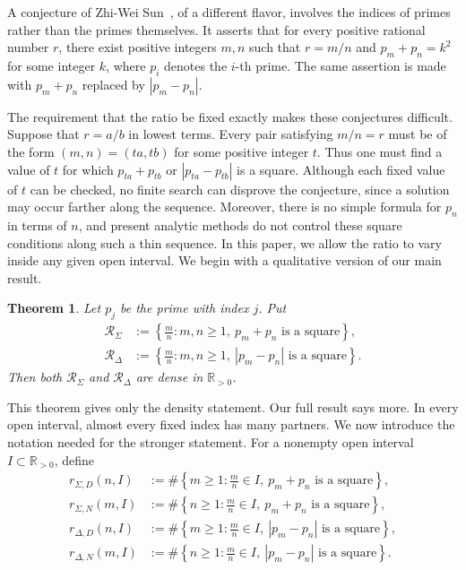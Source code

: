 \documentclass[12pt,reqno]{amsart}
\numberwithin{equation}{section}
\theoremstyle{plain}
\newtheorem{theorem}{Theorem}[section]
\theoremstyle{remark}
\begin{document}
A conjecture of Zhi-Wei Sun~\cite[Conjecture 4.4]{Sun2017}, of a different flavor, involves the indices of primes rather than the primes themselves.
It asserts that for every positive rational number $r$, there exist positive integers $m,n$ such that $r=m/n$ and $p_m+p_n=k^2$ for some integer $k$, where $p_i$ denotes the $i$-th prime.
The same assertion is made with $p_m+p_n$ replaced by $|p_m-p_n|$.

The requirement that the ratio be fixed exactly makes these conjectures difficult.
Suppose that $r=a/b$ in lowest terms.
Every pair satisfying $m/n=r$ must be of the form $(m,n)=(ta,tb)$ for some positive integer $t$.
Thus one must find a value of $t$ for which $p_{ta}+p_{tb}$ or $|p_{ta}-p_{tb}|$ is a square.  Although each fixed value of $t$ can be checked, no finite search can disprove the conjecture, since a
solution may occur farther along the sequence.  Moreover, there is no simple formula for $p_n$ in terms of $n$, and present analytic methods do not control
these square conditions along such a thin sequence.
In this paper, we allow the ratio to vary inside any given open interval.
We begin with a qualitative version of our main result.

\begin{theorem}\label{thm:density}
Let $p_j$ be the prime with index $j$.
Put
\begin{align*}
 \mathcal R_\Sigma
 &:=\left\{\frac mn:m,n\geq1,\ p_m+p_n\text{ is a square}\right\},\\
 \mathcal R_\Delta
 &:=\left\{\frac mn:m,n\geq1,\ |p_m-p_n|
        \text{ is a square}\right\}.
\end{align*}
Then both $\mathcal R_\Sigma$ and $\mathcal R_\Delta$ are dense in $\mathbb R_{>0}$.
\end{theorem}

This theorem gives only the density statement.  Our full result says more.
In every open interval, almost every fixed index has many partners.
We now introduce the notation needed for the stronger statement.
For a nonempty open interval $I\subset\mathbb R_{>0}$, define
\begin{align*}
 r_{\Sigma,D}(n,I)
 &:=\#\left\{m\geq1:\frac mn\in I,\ p_m+p_n\text{ is a square}\right\},\\
 r_{\Sigma,N}(m,I)
 &:=\#\left\{n\geq1:\frac mn\in I,\ p_m+p_n\text{ is a square}\right\},\\
 r_{\Delta,D}(n,I)
 &:=\#\left\{m\geq1:\frac mn\in I,\
 |p_m-p_n|\text{ is a square}\right\},\\
 r_{\Delta,N}(m,I)
 &:=\#\left\{n\geq1:\frac mn\in I,\
 |p_m-p_n|\text{ is a square}\right\}.
\end{align*}
\end{document}
